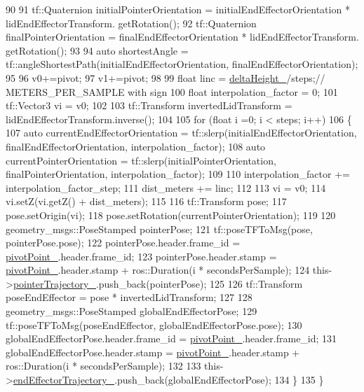 \begin{DoxyCode}
90 
91         tf::Quaternion initialPointerOrientation = initialEndEffectorOrientation * lidEndEffectorTransform.
      getRotation();
92         tf::Quaternion finalPointerOrientation = finalEndEffectorOrientation * lidEndEffectorTransform.
      getRotation();
93 
94         \textcolor{keyword}{auto} shortestAngle = tf::angleShortestPath(initialEndEffectorOrientation, 
      finalEndEffectorOrientation);
95 
96         v0+=pivot;
97         v1+=pivot;
98         
99         \textcolor{keywordtype}{float} linc = \hyperlink{classcl__move__group__interface_1_1CbCircularPouringMotion_a7009d617bcd8ac1fba49100444434f3c}{deltaHeight\_}/steps;\textcolor{comment}{// METERS\_PER\_SAMPLE with sign}
100         \textcolor{keywordtype}{float} interpolation\_factor = 0;
101         tf::Vector3 vi = v0;
102 
103         tf::Transform invertedLidTransform = lidEndEffectorTransform.inverse(); 
104 
105         \textcolor{keywordflow}{for} (\textcolor{keywordtype}{float} i =0; i < steps; i++)
106         \{
107             \textcolor{keyword}{auto} currentEndEffectorOrientation = tf::slerp(initialEndEffectorOrientation, 
      finalEndEffectorOrientation, interpolation\_factor);
108             \textcolor{keyword}{auto} currentPointerOrientation = tf::slerp(initialPointerOrientation, finalPointerOrientation, 
      interpolation\_factor);
109 
110             interpolation\_factor += interpolation\_factor\_step;
111             dist\_meters += linc;
112 
113             vi = v0;
114             vi.setZ(vi.getZ() + dist\_meters);
115 
116             tf::Transform pose;
117             pose.setOrigin(vi);
118             pose.setRotation(currentPointerOrientation);
119 
120             geometry\_msgs::PoseStamped pointerPose;
121             tf::poseTFToMsg(pose, pointerPose.pose);
122             pointerPose.header.frame\_id = \hyperlink{classcl__move__group__interface_1_1CbCircularPouringMotion_a4c100d8ba3e57f7ddfb614017d115fca}{pivotPoint\_}.header.frame\_id;
123             pointerPose.header.stamp = \hyperlink{classcl__move__group__interface_1_1CbCircularPouringMotion_a4c100d8ba3e57f7ddfb614017d115fca}{pivotPoint\_}.header.stamp + ros::Duration(i * 
      secondsPerSample);
124             this->\hyperlink{classcl__move__group__interface_1_1CbCircularPouringMotion_a6f53442c47cf9280d8be72ea1c35546f}{pointerTrajectory\_}.push\_back(pointerPose);
125 
126             tf::Transform poseEndEffector = pose * invertedLidTransform;
127             
128             geometry\_msgs::PoseStamped globalEndEffectorPose;
129             tf::poseTFToMsg(poseEndEffector, globalEndEffectorPose.pose);
130             globalEndEffectorPose.header.frame\_id = \hyperlink{classcl__move__group__interface_1_1CbCircularPouringMotion_a4c100d8ba3e57f7ddfb614017d115fca}{pivotPoint\_}.header.frame\_id;
131             globalEndEffectorPose.header.stamp = \hyperlink{classcl__move__group__interface_1_1CbCircularPouringMotion_a4c100d8ba3e57f7ddfb614017d115fca}{pivotPoint\_}.header.stamp + ros::Duration(i * 
      secondsPerSample);
132 
133             this->\hyperlink{classcl__move__group__interface_1_1CbMoveEndEffectorTrajectory_ae13dfd31ea3660646e03882f0c2c29f0}{endEffectorTrajectory\_}.push\_back(globalEndEffectorPose);
134         \}
135     \}
\end{DoxyCode}
